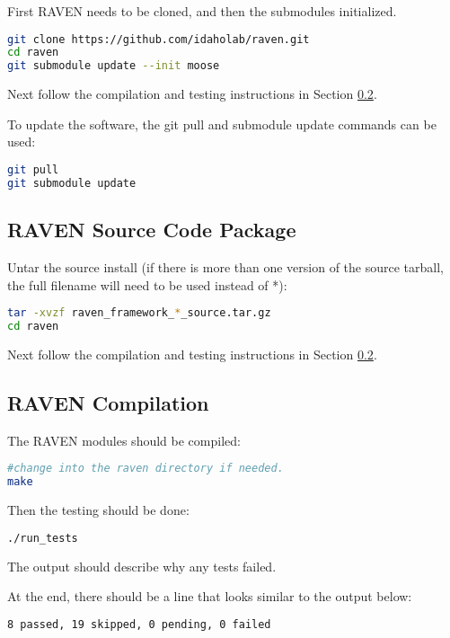 First RAVEN needs to be cloned, and then the submodules initialized.

\begin{lstlisting}[language=bash]
git clone https://github.com/idaholab/raven.git
cd raven
git submodule update --init moose
\end{lstlisting}

Next follow the compilation and testing instructions in Section \ref{raven_compilation}.

To update the software, the git pull and submodule update commands can
be used:

\begin{lstlisting}[language=bash]
git pull
git submodule update
\end{lstlisting}


\subsection{RAVEN Source Code Package}
\label{raven_source_package}

Untar the source install (if there is more than one version of the
source tarball, the full filename will need to be used instead of *):

\begin{lstlisting}[language=bash]
tar -xvzf raven_framework_*_source.tar.gz
cd raven
\end{lstlisting}

Next follow the compilation and testing instructions in Section
\ref{raven_compilation}.

\subsection{RAVEN Compilation}
\label{raven_compilation}

The RAVEN modules should be compiled:

\begin{lstlisting}[language=bash]
#change into the raven directory if needed.
make
\end{lstlisting}

Then the testing should be done:

\begin{lstlisting}[language=bash]
./run_tests
\end{lstlisting}

The output should describe why any tests failed.

At the end, there should be a line that looks similar to the output below:
\begin{lstlisting}[language=bash]
8 passed, 19 skipped, 0 pending, 0 failed
\end{lstlisting}

